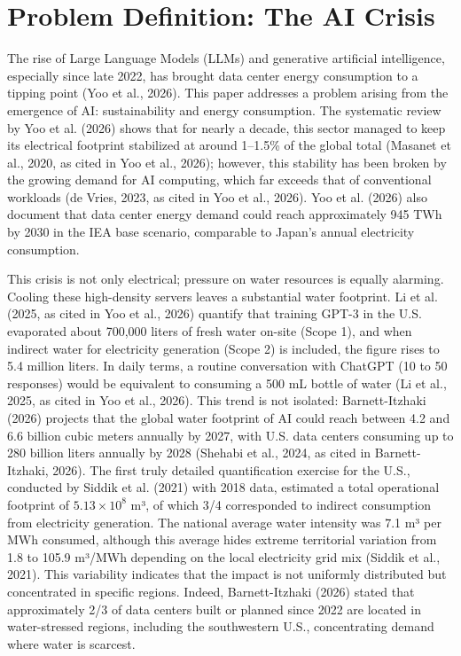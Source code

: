 \documentclass[conference]{IEEEtran}
\begin{document}
\section{Problem Definition: The AI Crisis}

The rise of Large Language Models (LLMs) and generative artificial intelligence, especially since late 2022, has brought data center energy consumption to a tipping point (Yoo et al., 2026). This paper addresses a problem arising from the emergence of AI: sustainability and energy consumption. The systematic review by Yoo et al. (2026) shows that for nearly a decade, this sector managed to keep its electrical footprint stabilized at around 1–1.5\% of the global total (Masanet et al., 2020, as cited in Yoo et al., 2026); however, this stability has been broken by the growing demand for AI computing, which far exceeds that of conventional workloads (de Vries, 2023, as cited in Yoo et al., 2026). Yoo et al. (2026) also document that data center energy demand could reach approximately 945 TWh by 2030 in the IEA base scenario, comparable to Japan's annual electricity consumption.

This crisis is not only electrical; pressure on water resources is equally alarming. Cooling these high-density servers leaves a substantial water footprint. Li et al. (2025, as cited in Yoo et al., 2026) quantify that training GPT-3 in the U.S. evaporated about 700,000 liters of fresh water on-site (Scope 1), and when indirect water for electricity generation (Scope 2) is included, the figure rises to 5.4 million liters. In daily terms, a routine conversation with ChatGPT (10 to 50 responses) would be equivalent to consuming a 500 mL bottle of water (Li et al., 2025, as cited in Yoo et al., 2026). This trend is not isolated: Barnett-Itzhaki (2026) projects that the global water footprint of AI could reach between 4.2 and 6.6 billion cubic meters annually by 2027, with U.S. data centers consuming up to 280 billion liters annually by 2028 (Shehabi et al., 2024, as cited in Barnett-Itzhaki, 2026). The first truly detailed quantification exercise for the U.S., conducted by Siddik et al. (2021) with 2018 data, estimated a total operational footprint of $5.13 \times 10^8$ m³, of which 3/4 corresponded to indirect consumption from electricity generation. The national average water intensity was 7.1 m³ per MWh consumed, although this average hides extreme territorial variation from 1.8 to 105.9 m³/MWh depending on the local electricity grid mix (Siddik et al., 2021). This variability indicates that the impact is not uniformly distributed but concentrated in specific regions. Indeed, Barnett-Itzhaki (2026) stated that approximately 2/3 of data centers built or planned since 2022 are located in water-stressed regions, including the southwestern U.S., concentrating demand where water is scarcest.
\end{document}

